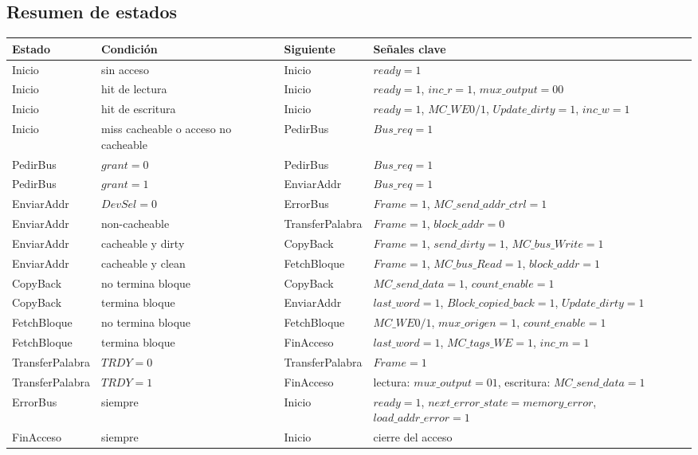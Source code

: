 \documentclass[a4paper,11pt]{article}
\begin{document}
\subsection*{Resumen de estados}

\renewcommand{\arraystretch}{1.2}

\begin{longtable}{|p{2.2cm}|p{4.4cm}|p{2.5cm}|p{5.8cm}|}
\hline
\textbf{Estado} & \textbf{Condición} & \textbf{Siguiente} & \textbf{Señales clave} \\
\hline
Inicio & sin acceso & Inicio & $ready=1$ \\
\hline
Inicio & hit de lectura & Inicio & $ready=1$, $inc\_r=1$, $mux\_output=00$ \\
\hline
Inicio & hit de escritura & Inicio & $ready=1$, $MC\_WE0/1$, $Update\_dirty=1$, $inc\_w=1$ \\
\hline
Inicio & miss cacheable o acceso no cacheable & PedirBus & $Bus\_req=1$ \\
\hline
PedirBus & $grant=0$ & PedirBus & $Bus\_req=1$ \\
\hline
PedirBus & $grant=1$ & EnviarAddr & $Bus\_req=1$ \\
\hline
EnviarAddr & $DevSel=0$ & ErrorBus & $Frame=1$, $MC\_send\_addr\_ctrl=1$ \\
\hline
EnviarAddr & non-cacheable & TransferPalabra & $Frame=1$, $block\_addr=0$ \\
\hline
EnviarAddr & cacheable y dirty & CopyBack & $Frame=1$, $send\_dirty=1$, $MC\_bus\_Write=1$ \\
\hline
EnviarAddr & cacheable y clean & FetchBloque & $Frame=1$, $MC\_bus\_Read=1$, $block\_addr=1$ \\
\hline
CopyBack & no termina bloque & CopyBack & $MC\_send\_data=1$, $count\_enable=1$ \\
\hline
CopyBack & termina bloque & EnviarAddr & $last\_word=1$, $Block\_copied\_back=1$, $Update\_dirty=1$ \\
\hline
FetchBloque & no termina bloque & FetchBloque & $MC\_WE0/1$, $mux\_origen=1$, $count\_enable=1$ \\
\hline
FetchBloque & termina bloque & FinAcceso & $last\_word=1$, $MC\_tags\_WE=1$, $inc\_m=1$ \\
\hline
TransferPalabra & $TRDY=0$ & TransferPalabra & $Frame=1$ \\
\hline
TransferPalabra & $TRDY=1$ & FinAcceso & lectura: $mux\_output=01$, escritura: $MC\_send\_data=1$ \\
\hline
ErrorBus & siempre & Inicio & $ready=1$, $next\_error\_state=memory\_error$, $load\_addr\_error=1$ \\
\hline
FinAcceso & siempre & Inicio & cierre del acceso \\
\hline
\end{longtable}
\end{document}
